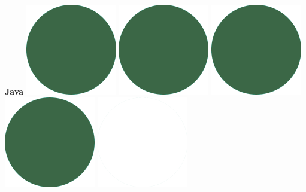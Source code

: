 \documentclass[]{commands}
\begin{document}
\begin{aside}
\textbf{Java}\hfill
\includegraphics[scale=0.11]{img/IPSGreenDots.png}
\includegraphics[scale=0.11]{img/IPSGreenDots.png}
\includegraphics[scale=0.11]{img/IPSGreenDots.png}
\includegraphics[scale=0.11]{img/IPSGreenDots.png}
\includegraphics[scale=0.11]{img/WhiteDots.png}


\end{aside}
\end{document}
